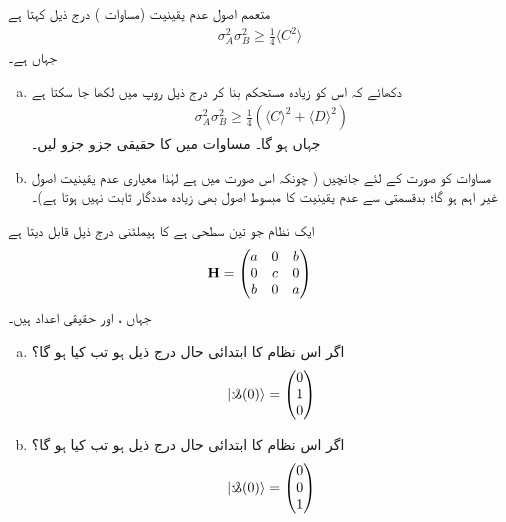 \quad  متعمم اصول عدم   یقینیت    (مساوات ) درج  ذیل  کہتا ہے
   \begin{align*} 
\sigma_{A}^{2}\sigma_{B}^{2}\geq\frac{1}{4}\langle C^{2} \rangle 
  \end{align*} 
جہاں  ہے۔
\begin{enumerate}[a.]  
\item
دکھائے کہ اس کو زیادہ  مستحکم  بنا  کر درج  ذیل روپ میں لکھا  جا سکتا ہے
  \begin{align}\label{مساوات_سوال_مستحکم_عدم_یقینیت} 
\sigma_{A}^{2}\sigma_{B}^{2}\geq\frac{1}{4}(\langle C\rangle^{2}+\langle D \rangle ^{2}) 
  \end{align} 
جہاں    ہو گا۔   مساوات     میں  کا حقیقی جزو     جزو  لیں۔  
\item
مساوات    کو      صورت  کے لئے  جانچیں (    چونکہ اس صورت میں       ہے لہٰذا  معیاری عدم یقینیت اصول  غیر اہم   ہو گا؛   بدقسمتی سے عدم  یقینیت  کا  مبسوط اصول بھی زیادہ مددگار ثابت نہیں ہوتا ہے)۔  
\end{enumerate}

ایک نظام جو  تین سطحی ہے کا ہیملٹنی  درج   ذیل  قابل دیتا ہے
  \begin{align*} 
\bold{H}=\begin{pmatrix}
a&0&b\\
0&c&0\\
b&0&a
\end{pmatrix} 
  \end{align*} 
جہاں ،  اور   حقیقی اعداد ہیں۔
\begin{enumerate}[a.]
   \item
    اگر اس نظام کا ابتدائی حال درج  ذیل  ہو تب       کیا ہو گا؟  
  \begin{align*} 
|\s(0) \rangle=\begin{pmatrix}
0\\
1\\
0
\end{pmatrix} 
  \end{align*} 
\item
 اگر اس نظام کا ابتدائی حال درج ذیل  ہو تب    کیا ہو گا؟  
  \begin{align*} 
| \s(0)\rangle =\begin{pmatrix}
0\\
0\\
1
\end{pmatrix} 
  \end{align*} 
\end{enumerate}

